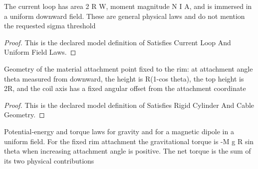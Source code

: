 \begin{definition}
  \label{def:physics:phyx-mini-0954:phyxminiproblems-problemphyxmini0954-satisfiescurrentloopanduniformfieldlaws}
  The current loop has area 2 R W, moment magnitude N I A, and is immersed in a uniform downward field. These are general physical laws and do not mention the requested sigma threshold
\end{definition}
\begin{proof}
  This is the declared model definition of Satisfies Current Loop And Uniform Field Laws.
\end{proof}
\begin{definition}
  \label{def:physics:phyx-mini-0954:phyxminiproblems-problemphyxmini0954-satisfiesrigidcylinderandcablegeometry}
  Geometry of the material attachment point fixed to the rim: at attachment angle theta measured from downward, the height is R(1-cos theta), the top height is 2R, and the coil axis has a fixed angular offset from the attachment coordinate
\end{definition}
\begin{proof}
  This is the declared model definition of Satisfies Rigid Cylinder And Cable Geometry.
\end{proof}
\begin{definition}
  \label{def:physics:phyx-mini-0954:phyxminiproblems-problemphyxmini0954-satisfiesmagneticandgravitationalenergylaws}
  Potential-energy and torque laws for gravity and for a magnetic dipole in a uniform field. For the fixed rim attachment the gravitational torque is -M g R sin theta when increasing attachment angle is positive. The net torque is the sum of its two physical contributions
\end{definition}
